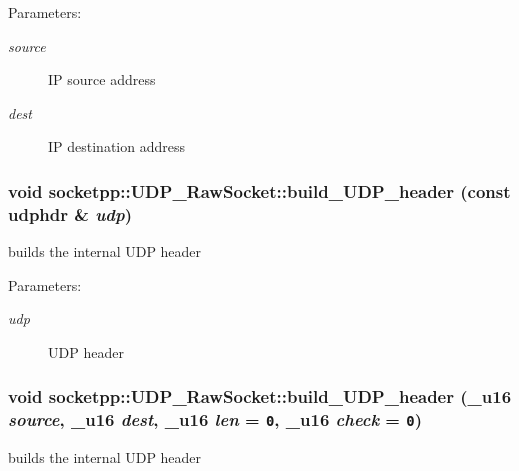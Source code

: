 \begin{Desc}
\item[Parameters:]
\begin{description}
\item[{\em source}]IP source address \item[{\em dest}]IP destination address \end{description}
\end{Desc}
\hypertarget{classsocketpp_1_1UDP__RawSocket_b194e3ab2f5b758dee8a0c715d895c1e}{
\subsubsection[{build\_\-UDP\_\-header}]{\setlength{\rightskip}{0pt plus 5cm}void socketpp::UDP\_\-RawSocket::build\_\-UDP\_\-header (const udphdr \& {\em udp})}}
\label{classsocketpp_1_1UDP__RawSocket_b194e3ab2f5b758dee8a0c715d895c1e}


builds the internal UDP header 

\begin{Desc}
\item[Parameters:]
\begin{description}
\item[{\em udp}]UDP header \end{description}
\end{Desc}
\hypertarget{classsocketpp_1_1UDP__RawSocket_1b055bafc0e178db6a3940093dc0f8e0}{
\subsubsection[{build\_\-UDP\_\-header}]{\setlength{\rightskip}{0pt plus 5cm}void socketpp::UDP\_\-RawSocket::build\_\-UDP\_\-header (\_\-u16 {\em source}, \/  \_\-u16 {\em dest}, \/  \_\-u16 {\em len} = {\tt 0}, \/  \_\-u16 {\em check} = {\tt 0})}}
\label{classsocketpp_1_1UDP__RawSocket_1b055bafc0e178db6a3940093dc0f8e0}


builds the internal UDP header 


